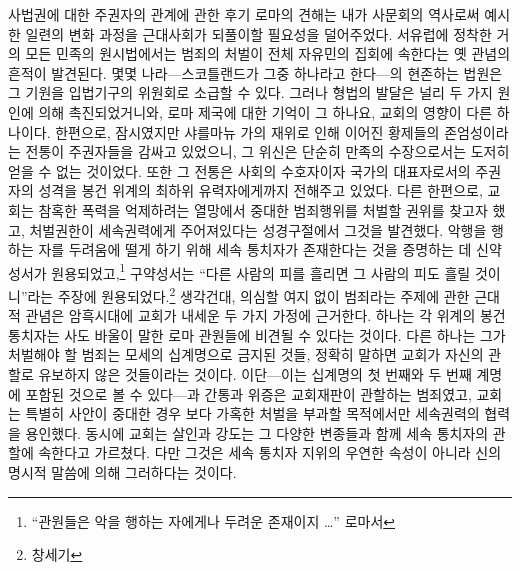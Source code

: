 사법권에 대한 주권자의 관계에 관한 후기 로마의 견해는
내가 사문회의 역사로써 예시한 일련의 변화 과정을
근대사회가
되풀이할 필요성을 덜어주었다.
서유럽에 정착한 거의 모든 민족의 원시법에서는
범죄의 처벌이 전체 자유민의 집회에 속한다는 옛 관념의 흔적이 발견된다.
몇몇 나라---스코틀랜드가 그중 하나라고 한다---의
현존하는 법원은 그 기원을 입법기구의 위원회로 소급할 수 있다.
그러나 형법의 발달은 널리 두 가지 원인에 의해 촉진되었거니와,
로마 제국에 대한 기억이 그 하나요,
교회의 영향이 다른 하나이다.
한편으로,
잠시였지만 샤를마뉴 가의 재위로 인해 이어진
황제들의 존엄성이라는 전통이 주권자들을 감싸고 있었으니,
그 위신은 단순히 만족의 수장으로서는 도저히 얻을 수 없는 것이었다.
또한 그 전통은
사회의 수호자이자 국가의 대표자로서의 주권자의 성격을
봉건 위계의 최하위 유력자에게까지
전해주고 있었다.
다른 한편으로,
교회는
참혹한 폭력을 억제하려는 열망에서
중대한 범죄행위를 처벌할 권위를 찾고자 했고,
처벌권한이 세속권력에게 주어져있다는 성경구절에서 그것을 발견했다.
악행을 행하는 자를 두려움에 떨게 하기 위해
세속 통치자가 존재한다는 것을 증명하는 데
신약성서가 원용되었고,\footnote{%
  ``관원들은 악을 행하는 자에게나 두려운 존재이지 \ldots''
  로마서 }
구약성서는 ``다른 사람의 피를 흘리면 그 사람의 피도 흘릴 것이니''라는
주장에 원용되었다.\footnote{%
  창세기 }
생각건대,
의심할 여지 없이
범죄라는 주제에 관한 근대적 관념은
암흑시대에 교회가 내세운 두 가지 가정에 근거한다.
하나는
각 위계의 봉건 통치자는 사도 바울이 말한
로마 관원들에 비견될 수 있다는 것이다.
다른 하나는
그가 처벌해야 할 범죄는
모세의 십계명으로 금지된 것들,
정확히 말하면 교회가 자신의 관할로 유보하지 않은 것들이라는 것이다.
이단---이는 십계명의 첫 번째와 두 번째 계명에
포함된 것으로 볼 수 있다---과 간통과 위증은
교회재판이 관할하는 범죄였고,
교회는
특별히 사안이 중대한 경우
보다 가혹한 처벌을 부과할 목적에서만
세속권력의 협력을 용인했다.
동시에
교회는
살인과 강도는
그 다양한 변종들과 함께
세속 통치자의 관할에 속한다고 가르쳤다.
다만 그것은 세속 통치자 지위의 우연한 속성이 아니라
신의 명시적 말씀에 의해 그러하다는 것이다.

